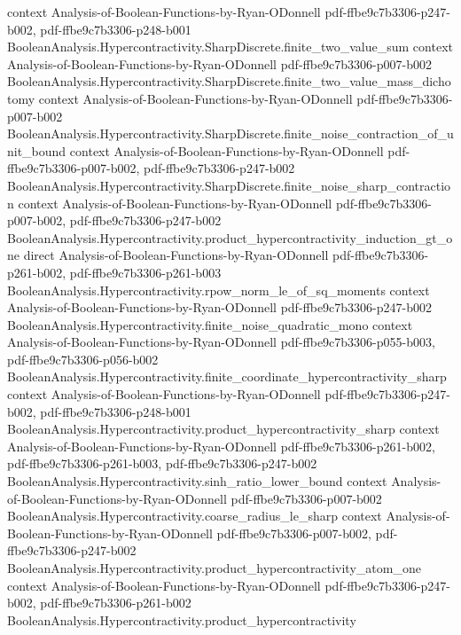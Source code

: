 \begin{theorem}
  {context}
  {Analysis-of-Boolean-Functions-by-Ryan-ODonnell}
  {pdf-ffbe9c7b3306-p247-b002,
    pdf-ffbe9c7b3306-p248-b001}
\proofstep
  {BooleanAnalysis.Hypercontractivity.SharpDiscrete.finite_two_value_sum}
  {context}
  {Analysis-of-Boolean-Functions-by-Ryan-ODonnell}
  {pdf-ffbe9c7b3306-p007-b002}
\proofstep
  {BooleanAnalysis.Hypercontractivity.SharpDiscrete.finite_two_value_mass_dichotomy}
  {context}
  {Analysis-of-Boolean-Functions-by-Ryan-ODonnell}
  {pdf-ffbe9c7b3306-p007-b002}
\proofstep
  {BooleanAnalysis.Hypercontractivity.SharpDiscrete.finite_noise_contraction_of_unit_bound}
  {context}
  {Analysis-of-Boolean-Functions-by-Ryan-ODonnell}
  {pdf-ffbe9c7b3306-p007-b002,
    pdf-ffbe9c7b3306-p247-b002}
\proofstep
  {BooleanAnalysis.Hypercontractivity.SharpDiscrete.finite_noise_sharp_contraction}
  {context}
  {Analysis-of-Boolean-Functions-by-Ryan-ODonnell}
  {pdf-ffbe9c7b3306-p007-b002,
    pdf-ffbe9c7b3306-p247-b002}
\proofstep
  {BooleanAnalysis.Hypercontractivity.product_hypercontractivity_induction_gt_one}
  {direct}
  {Analysis-of-Boolean-Functions-by-Ryan-ODonnell}
  {pdf-ffbe9c7b3306-p261-b002,
    pdf-ffbe9c7b3306-p261-b003}
\proofstep
  {BooleanAnalysis.Hypercontractivity.rpow_norm_le_of_sq_moments}
  {context}
  {Analysis-of-Boolean-Functions-by-Ryan-ODonnell}
  {pdf-ffbe9c7b3306-p247-b002}
\proofstep
  {BooleanAnalysis.Hypercontractivity.finite_noise_quadratic_mono}
  {context}
  {Analysis-of-Boolean-Functions-by-Ryan-ODonnell}
  {pdf-ffbe9c7b3306-p055-b003,
    pdf-ffbe9c7b3306-p056-b002}
\proofstep
  {BooleanAnalysis.Hypercontractivity.finite_coordinate_hypercontractivity_sharp}
  {context}
  {Analysis-of-Boolean-Functions-by-Ryan-ODonnell}
  {pdf-ffbe9c7b3306-p247-b002,
    pdf-ffbe9c7b3306-p248-b001}
\proofstep
  {BooleanAnalysis.Hypercontractivity.product_hypercontractivity_sharp}
  {context}
  {Analysis-of-Boolean-Functions-by-Ryan-ODonnell}
  {pdf-ffbe9c7b3306-p261-b002,
    pdf-ffbe9c7b3306-p261-b003,
    pdf-ffbe9c7b3306-p247-b002}
\proofstep
  {BooleanAnalysis.Hypercontractivity.sinh_ratio_lower_bound}
  {context}
  {Analysis-of-Boolean-Functions-by-Ryan-ODonnell}
  {pdf-ffbe9c7b3306-p007-b002}
\proofstep
  {BooleanAnalysis.Hypercontractivity.coarse_radius_le_sharp}
  {context}
  {Analysis-of-Boolean-Functions-by-Ryan-ODonnell}
  {pdf-ffbe9c7b3306-p007-b002,
    pdf-ffbe9c7b3306-p247-b002}
\proofstep
  {BooleanAnalysis.Hypercontractivity.product_hypercontractivity_atom_one}
  {context}
  {Analysis-of-Boolean-Functions-by-Ryan-ODonnell}
  {pdf-ffbe9c7b3306-p247-b002,
    pdf-ffbe9c7b3306-p261-b002}
\proofstep
  {BooleanAnalysis.Hypercontractivity.product_hypercontractivity}

\end{theorem}

